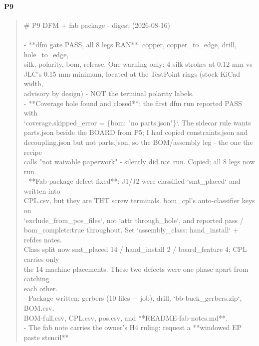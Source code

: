 \documentclass[11pt,a4paper]{article}
\begin{document}
\paragraph*{P9}
\begin{quote}\small\ttfamily\raggedright
\# P9 DFM + fab package - digest (2026-08-16)\\
~\\
- {*}{*}dfm gate PASS, all 8 legs RAN{*}{*}: copper, copper\_to\_edge, drill, hole\_to\_edge,\\
  silk, polarity, bom, release. One warning only: 4 silk strokes at 0.12 mm vs\\
  JLC's 0.15 mm minimum, located at the TestPoint rings (stock KiCad width,\\
  advisory by design) - NOT the terminal polarity labels.\\
- {*}{*}Coverage hole found and closed{*}{*}: the first dfm run reported PASS with\\
  `coverage.skipped\_error = \{bom: "no parts.json"\}`. The sidecar rule wants\\
  parts.json beside the BOARD from P5; I had copied constraints.json and\\
  decoupling.json but not parts.json, so the BOM/assembly leg - the one the recipe\\
  calls "not waivable paperwork" - silently did not run. Copied; all 8 legs now run.\\
- {*}{*}Fab-package defect fixed{*}{*}: J1/J2 were classified `smt\_placed` and written into\\
  CPL.csv, but they are THT screw terminals. bom\_cpl's auto-classifier keys on\\
  `exclude\_from\_pos\_files`, not `attr through\_hole`, and reported pass /\\
  bom\_complete:true throughout. Set `assembly\_class: hand\_install` + refdes notes.\\
  Class split now smt\_placed 14 / hand\_install 2 / board\_feature 4; CPL carries only\\
  the 14 machine placements. These two defects were one phase apart from catching\\
  each other.\\
- Package written: gerbers (10 files + job), drill, `bb-buck\_gerbers.zip`, BOM.csv,\\
  BOM-full.csv, CPL.csv, pos.csv, and {*}{*}README-fab-notes.md{*}{*}.\\
- The fab note carries the owner's H4 ruling: request a {*}{*}windowed EP paste stencil{*}{*}\\

\end{quote}
\end{document}
